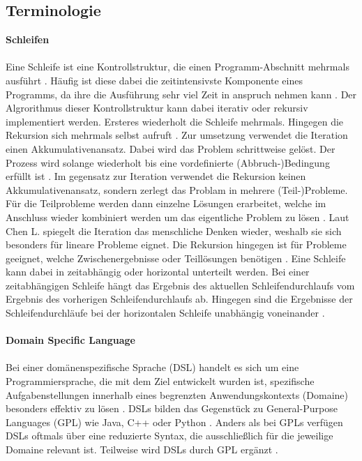 \documentclass{article}
\begin{document}
    \subsection{Terminologie}
    \label{Terminologie}
    \textbf{Schleifen}\\
    \\
    Eine Schleife ist eine Kontrollstruktur, die einen Programm-Abschnitt mehrmals ausführt \cite{22}.
    Häufig ist diese dabei die zeitintensivste Komponente eines Programms, da ihre die Ausführung sehr viel Zeit in anspruch nehmen kann \cite{1}.
    Der Algrorithmus dieser Kontrollstruktur kann dabei iterativ oder rekursiv implementiert werden. Ersteres wiederholt die Schleife mehrmals. Hingegen die Rekursion sich mehrmals selbst aufruft \cite{3}.
    Zur umsetzung verwendet die Iteration einen Akkumulativenansatz. Dabei wird das Problem schrittweise gelöst. Der Prozess wird solange wiederholt bis eine vordefinierte (Abbruch-)Bedingung erfüllt ist \cite{3}.
    Im gegensatz zur Iteration verwendet die Rekursion keinen Akkumulativenansatz, sondern zerlegt das Problam in mehrere (Teil-)Probleme. Für die Teilprobleme werden dann einzelne Lösungen erarbeitet, welche im Anschluss wieder kombiniert werden um das eigentliche Problem zu lösen \cite{3}.
    Laut Chen L. spiegelt die Iteration das menschliche Denken wieder, weshalb sie sich besonders für lineare Probleme eignet. 
    Die Rekursion hingegen ist für Probleme geeignet, welche Zwischenergebnisse oder Teillösungen benötigen \cite{3}.
    Eine Schleife kann dabei in zeitabhängig oder horizontal unterteilt werden. Bei einer zeitabhängigen Schleife hängt das Ergebnis des aktuellen Schleifendurchlaufs vom Ergebnis des vorherigen Schleifendurchlaufs ab. Hingegen sind die Ergebnisse der Schleifendurchläufe bei der horizontalen Schleife unabhängig voneinander \cite{5}.\\
    \\
    \textbf{Domain Specific Language}\\
    \\
    Bei einer domänenspezifische Sprache (DSL) handelt es sich um eine Programmiersprache, die mit dem Ziel entwickelt wurden ist, spezifische Aufgabenstellungen innerhalb eines begrenzten Anwendungskontexts (Domaine) besonders effektiv zu lösen \cite{18}.
    DSLs bilden das Gegenstück zu General-Purpose Languages (GPL) wie Java, C++ oder Python \cite{14}.
    Anders als bei GPLs verfügen DSLs oftmals über eine reduzierte Syntax, die ausschließlich für die jeweilige Domaine relevant ist. Teilweise wird DSLs durch GPL ergänzt \cite{18}.
\end{document}
